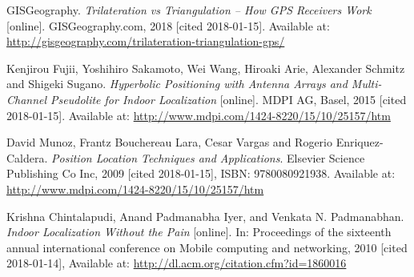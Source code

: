 \begin{thebibliography}{10}
GISGeography. \textit{Trilateration vs Triangulation – How GPS Receivers Work} [online]. GISGeography.com, 2018 [cited 2018-01-15]. Available at: \url{http://gisgeography.com/trilateration-triangulation-gps/}

Kenjirou Fujii, Yoshihiro Sakamoto, Wei Wang, Hiroaki Arie, Alexander Schmitz and Shigeki Sugano. \textit{Hyperbolic Positioning with Antenna Arrays and Multi-Channel Pseudolite for Indoor Localization} [online]. MDPI AG, Basel, 2015 [cited 2018-01-15]. Available at: \url{http://www.mdpi.com/1424-8220/15/10/25157/htm}

David Munoz, Frantz Bouchereau Lara, Cesar Vargas and Rogerio Enriquez-Caldera. \textit{Position Location Techniques and Applications}. Elsevier Science Publishing Co Inc, 2009 [cited 2018-01-15], ISBN: 9780080921938. Available at: \url{http://www.mdpi.com/1424-8220/15/10/25157/htm}


Krishna Chintalapudi, Anand Padmanabha Iyer, and Venkata N. Padmanabhan. \textit{Indoor Localization Without the Pain} [online]. In: Proceedings of the sixteenth annual international conference on Mobile computing and networking, 2010 [cited 2018-01-14], Available at: \url{http://dl.acm.org/citation.cfm?id=1860016}

\end{thebibliography}